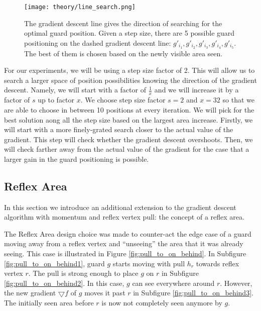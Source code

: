 \begin{figure}[h!]
    \centering
    \texttt{[image: theory/line\_search.png]}
    \caption{The gradient descent line gives the direction of searching for the optimal guard position. Given a step size, there are 5 possible guard positioning on the dashed gradient descent line: $g'_{i_1}, g'_{i_2}, g'_{i_3}, g'_{i_4}, g'_{i_5}$. The best of them is chosen based on the newly visible area seen.}
    \label{fig:line}
\end{figure}

For our experiments, we will be using a step size factor of 2. This will allow us to search a larger space of position possibilities knowing the direction of the gradient descent. 
Namely, we will start with a factor of $\frac 1 x$ and we will increase it by a factor of $s$ up to factor $x$. We choose step size factor $s = 2$ and $x = 32$ so that we are able to choose in between 10 positions at every iteration. We will pick for the best solution aong all the step size based on the largest area increase. Firstly, we will start with a more finely-grated search closer to the actual value of the gradient. This step will check whether the gradient descent overshoots. Then, we will check farther away from the actual value of the gradient for the case that a larger gain in the guard positioning is possible.

\subsection{Reflex Area}
\label{sec:reflex_area}
In this section we introduce an additional extension to the gradient descent algorithm with momentum and reflex vertex pull: the concept of a reflex area. 

The Reflex Area design choice was made to counter-act the edge case of a guard moving away from a reflex vertex and ``unseeing'' the area that it was already seeing. This case is illustrated in Figure \ref{fig:pull_to_on_behind}. In Subfigure \ref{fig:pull_to_on_behind1}, guard $g$ starts moving with pull $h_r$ towards reflex vertex $r$. The pull is strong enough to place $g$ on $r$ in Subfigure \ref{fig:pull_to_on_behind2}. In this case, $g$ can see everywhere around $r$. However, the new gradient $\bigtriangledown f$ of $g$ moves it past $r$ in Subfigure \ref{fig:pull_to_on_behind3}. The initially seen area before $r$ is now not completely seen anymore by $g$.

